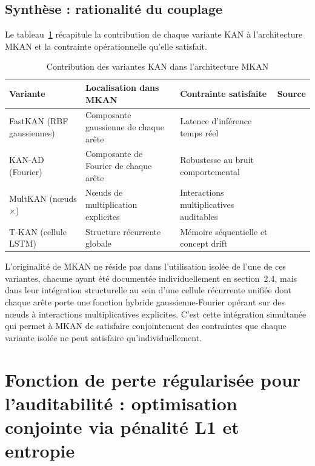 \documentclass[11pt,a4paper,oneside]{report}
\theoremstyle{definition}
\theoremstyle{remark}
\begin{document}
\subsection{Synthèse : rationalité du couplage}

Le tableau~\ref{tab:contributions_mkan} récapitule la contribution de chaque variante KAN à l'architecture MKAN et la contrainte opérationnelle qu'elle satisfait.

\begin{table}[htbp]
\centering
\small
\caption{Contribution des variantes KAN dans l'architecture MKAN}
\label{tab:contributions_mkan}
\renewcommand{\arraystretch}{1.5}
\begin{tabular}{@{}
  p{3.8cm}
  p{3.8cm}
  p{3.4cm}
  p{2.0cm}
@{}}
\toprule
\textbf{Variante}
  & \textbf{Localisation dans MKAN}
  & \textbf{Contrainte satisfaite}
  & \textbf{Source} \\
\midrule
FastKAN (RBF gaussiennes)
  & Composante gaussienne de chaque arête
  & Latence d'inférence temps réel
  & \citet{Li2024} \\
KAN-AD (Fourier)
  & Composante de Fourier de chaque arête
  & Robustesse au bruit comportemental
  & \citet{Zhou2025} \\
MultKAN (nœuds $\times$)
  & Nœuds de multiplication explicites
  & Interactions multiplicatives auditables
  & \citet{liu2024kan} \\
T-KAN (cellule LSTM)
  & Structure récurrente globale
  & Mémoire séquentielle et concept drift
  & \citet{Zhu2025} \\
\bottomrule
\end{tabular}
\end{table}

L'originalité de MKAN ne réside pas dans l'utilisation isolée de l'une de ces variantes, chacune ayant été documentée individuellement en section~2.4, mais dans leur intégration structurelle au sein d'une cellule récurrente unifiée dont chaque arête porte une fonction hybride gaussienne-Fourier opérant sur des nœuds à interactions multiplicatives explicites. C'est cette intégration simultanée qui permet à MKAN de satisfaire conjointement des contraintes que chaque variante isolée ne peut satisfaire qu'individuellement.

\section{Fonction de perte régularisée pour l'auditabilité : optimisation conjointe via pénalité L1 et entropie}
\label{subsec:mkan-loss}
\end{document}
